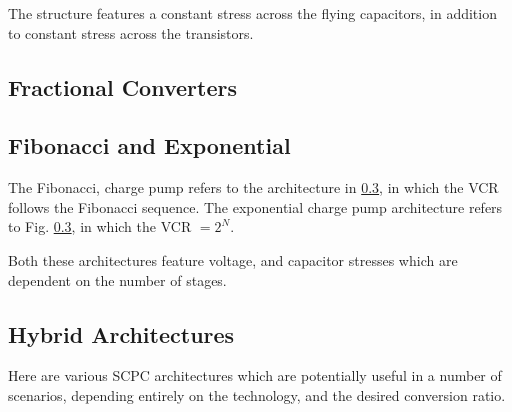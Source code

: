 	The structure features a constant stress across the flying capacitors, in addition to constant stress across the transistors.
	
	\subsection{Fractional Converters}
	\subsection{Fibonacci and Exponential}
	The Fibonacci, charge pump refers to the architecture in \ref{}, in which the VCR follows the Fibonacci sequence. The exponential charge pump architecture refers to Fig. \ref{}, in which the VCR $= 2^N$. 
	
	Both these architectures feature voltage, and capacitor stresses which are dependent on the number of stages. 

	\subsection{Hybrid Architectures}
	Here are various SCPC architectures which are potentially useful in a number of scenarios, depending entirely on the technology, and the desired conversion ratio.
	
	